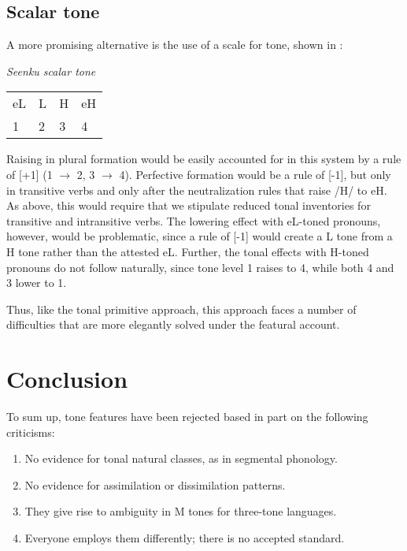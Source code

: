 \documentclass[output=paper]{langsci/langscibook}
\begin{document}
\subsection{Scalar tone}\label{sec:mcpherson:5.2}

A more promising alternative is the use of a scale for tone, shown in :

\ea\label{ex:mcpherson:26} {\it Seenku scalar tone} \\
\begin{tabular}[t]{llll}
  eL &  L & H & eH \\
  1 & 2 & 3 & 4 \\
\end{tabular}
\z

Raising in plural formation would be easily accounted for in this system by a rule of [+1] (1 $\rightarrow$ 2, 3 $\rightarrow$ 4). Perfective formation would be a rule of [-1], but only in transitive verbs and only after the neutralization rules that raise /H/ to eH. As above, this would require that we stipulate reduced tonal inventories for transitive and intransitive verbs. The lowering effect with eL-toned pronouns, however, would be problematic, since a rule of [-1] would create a L tone from a H tone rather than the attested eL. Further, the tonal effects with H-toned pronouns do not follow naturally, since tone level 1 raises to 4, while both 4 and 3 lower to 1.

Thus, like the tonal primitive approach, this approach faces a number of difficulties that are more elegantly solved under the featural account.


\section{Conclusion}\label{sec:mcpherson:SecConclusion}

To sum up, tone features have been rejected based in part on the following criticisms:

\begin{enumerate}
  \item No evidence for tonal natural classes, as in segmental phonology. 
  \item No evidence for assimilation or dissimilation patterns.
  \item They give rise to ambiguity in M tones for three-tone languages.
  \item Everyone employs them differently; there is no accepted standard.
\end{enumerate}
\end{document}

